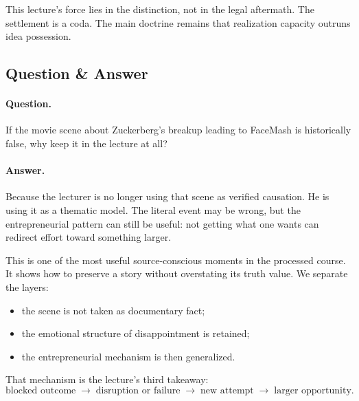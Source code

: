 \documentclass[11pt,oneside]{book}
\begin{document}
\begin{remark}
This lecture's force lies in the distinction, not in the legal aftermath. The settlement is a coda. The main doctrine remains that realization capacity outruns idea possession.
\end{remark}

\subsection{Question \& Answer}

\paragraph{Question.}
If the movie scene about Zuckerberg's breakup leading to FaceMash is historically false, why keep it in the lecture at all?

\paragraph{Answer.}
Because the lecturer is no longer using that scene as verified causation. He is using it as a thematic model. The literal event may be wrong, but the entrepreneurial pattern can still be useful: not getting what one wants can redirect effort toward something larger.

This is one of the most useful source-conscious moments in the processed course. It shows how to preserve a story without overstating its truth value. We separate the layers:
\begin{itemize}
\item the scene is not taken as documentary fact;
\item the emotional structure of disappointment is retained;
\item the entrepreneurial mechanism is then generalized.
\end{itemize}

That mechanism is the lecture's third takeaway:
\begin{equation}
\text{blocked outcome}
\;\longrightarrow\;
\text{disruption or failure}
\;\longrightarrow\;
\text{new attempt}
\;\longrightarrow\;
\text{larger opportunity}.
\end{equation}
\end{document}
